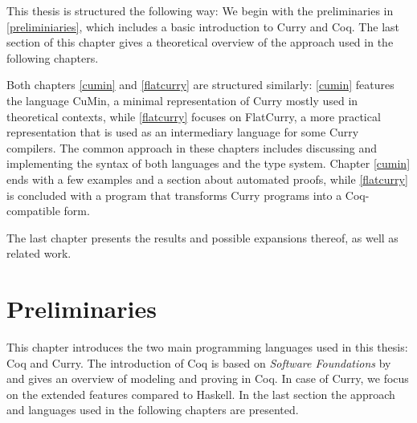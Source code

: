 \documentclass[paper = a4, fleqn, abstract=on, twoside]{scrreprt}
\begin{document}
\par \noindent
This thesis is structured the following way: We begin with the preliminaries in \autoref{preliminiaries}, which includes a basic introduction to Curry and Coq. The last section of this chapter gives a theoretical overview of the approach used in the following chapters.\\
\par \noindent
Both chapters \ref{cumin} and \ref{flatcurry} are structured similarly: \autoref{cumin} features the language CuMin, a minimal representation of Curry mostly used in theoretical contexts, while \autoref{flatcurry} focuses on FlatCurry, a more practical representation that is used as an intermediary language for some Curry compilers.
The common approach in these chapters includes discussing and implementing the syntax of both languages and the type system. Chapter \ref{cumin} ends with a few examples and a section about automated proofs, while \autoref{flatcurry} is concluded with a program that transforms Curry programs into a Coq-compatible form.\\
\par \noindent
The last chapter presents the results and possible expansions thereof, as well as related work. 
\chapter{Preliminaries}
\label{preliminiaries}
This chapter introduces the two main programming languages used in this thesis: Coq and Curry. The introduction of Coq is based on \textit{Software Foundations} by \citet{Pierce:SF} and gives an overview of modeling and proving in Coq. In case of Curry, we focus on the extended features compared to Haskell.
In the last section the approach and languages used in the following chapters are presented.
\end{document}
